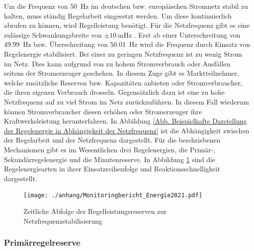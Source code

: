		Um die Frequenz von \SI{50}{\hertz} im deutschen bzw. europäischen Stromnetz stabil zu halten, muss ständig Regelarbeit eingesetzt werden.
		Um diese kontinuierlich abrufen zu können, wird Regelleistung benötigt.
		Für die Netzfrequenz gibt es eine zulässige Schwankungsbreite von $\pm\SI{10}{\milli\hertz}$ \cite{Angerer_Krohns}.
		Erst ab einer Unterschreitung von \SI{49,99}{\hertz} bzw. Überschreitung von \SI{50,01}{\hertz} wird die Frequenz durch Einsatz von Regelenergie stabilisiert.
		Bei einer zu geringen Netzfrequenz ist zu wenig Strom im Netz.
		Dies kann aufgrund von zu hohem Stromverbrauch oder Ausfällen seitens der Stromerzeuger geschehen.
		In diesem Zuge gibt es Marktteilnehmer, welche zusätzliche Reserven bzw. Kapazitäten anbieten oder Stromverbraucher, die ihren eigenen Verbrauch drosseln.
		Gegensätzlich dazu ist eine zu hohe Netzfrequenz auf zu viel Strom im Netz zurückzuführen. 
		In diesem Fall wiederum können Stromverbraucher diesen erhöhen oder Stromerzeuger ihre Kraftwerksleistung herunterfahren. 
		In Abbildung \ref{Abb. Beispielhafte Darstellung der Regelenergie in Abhängigkeit der Netzfrequenz} ist die Abhängigkeit zwischen der Regelarbeit und der Netzfrequenz dargestellt.
		Für die beschriebenen Mechanismen gibt es im Wesentlichen drei Regelenergien, die Primär-, Sekundärregelenergie und die Minutenreserve.
		In Abbildung \ref{Abb. Reaktionskette Regelenergien} sind die Regelenergiearten in ihrer Einsatzreihenfolge und Reaktionsschnelligkeit dargestellt. 
		
		\begin{figure} [H]
			\centering
			\label{Abb. Reaktionskette Regelenergien}
			\texttt{[image: ./anhang/Monitoringbericht\_Energie2021.pdf]}
			\caption{Zeitliche Abfolge der Regelleistungsreserven zur Netzfrequenzstabilisierung \cite[S. 207]{Elektrizitätswirtschaft}}
		\end{figure}
		
		\subsubsection{Primärregelreserve} \label{sect: Primärregelreserve}
		
